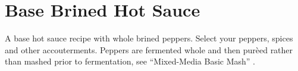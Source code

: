 \section[Brined Hot Sauce]{Base Brined Hot Sauce}

\label{base_lacto_brine_hotsauce}


\begin{recipestats}[
	servings=12 \fluidounce,
	preptime=1 \hour,
	bakingtime=2 \week,
	source=\citefield{fieryferments2017}{title} \cite{fieryferments2017},
	vegetarian=vegan,
	]
\end{recipestats}


\begin{recipeabstract}
	A base hot sauce recipe with whole brined peppers.
	Select your peppers, spices and other accouterments.
	Peppers are fermented whole and then pur\`{e}ed rather than mashed prior to fermentation, see ``Mixed-Media Basic Mash'' \cite{fieryferments2017}.
\end{recipeabstract}


\begin{ingredientcolumns}[1]
	\begin{ingredientblock}
		\\
		\\
		\\
		\\
		\\
		\\
		\\
		\\
	\end{ingredientblock}
\end{ingredientcolumns}


